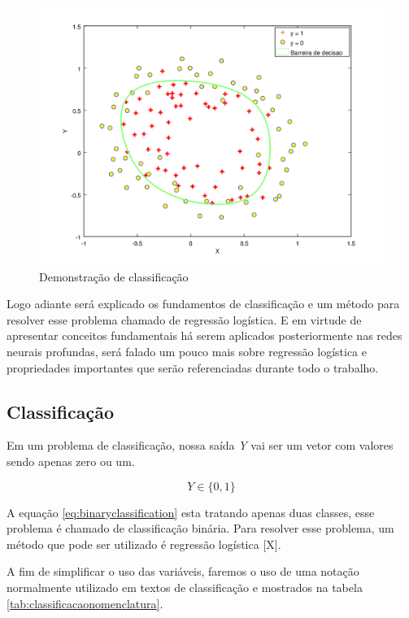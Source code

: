 \begin{figure}[htb]
  \caption{Demonstração de classificação}\label{fig:demclassificacao}
  \begin{center}
      \includegraphics[scale=0.55]{img/classificacao2}
  \end{center}
\end{figure}


Logo adiante será explicado os fundamentos de classificação e um método para resolver esse problema chamado de regressão logística. E em virtude de apresentar conceitos fundamentais há serem aplicados posteriormente nas redes neurais profundas, será falado um pouco mais sobre regressão logística e propriedades importantes que serão referenciadas durante todo o trabalho.

\subsection{Classificação}

Em um problema de classificação, nossa saída \textit{Y} vai ser um vetor com valores sendo apenas zero ou um.

\begin{equation}\label{eq:binaryclassification}
Y \in \{0, 1\}
\end{equation}

A equação \ref{eq:binaryclassification} esta tratando apenas duas classes, esse problema é chamado de classificação binária. Para resolver esse problema, um método que pode ser utilizado é regressão logística [X].

A fim de simplificar o uso das variáveis, faremos o uso de uma notação normalmente utilizado em textos de classificação e mostrados na tabela \autoref{tab:classificacaonomenclatura}.

